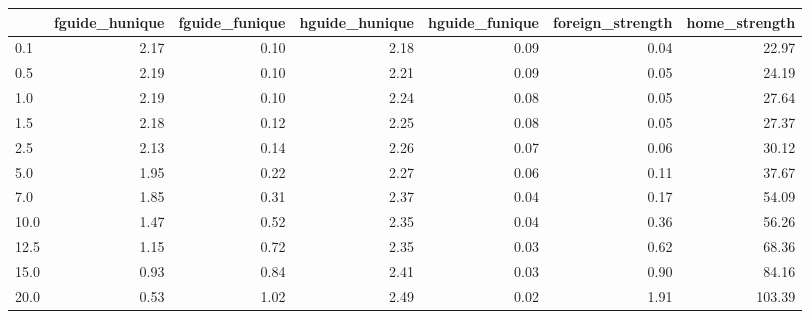 \begin{tabular}{lrrrrrr}
\toprule
 & fguide_hunique & fguide_funique & hguide_hunique & hguide_funique & foreign_strength & home_strength \\
\midrule
0.1 & 2.17 & 0.10 & 2.18 & 0.09 & 0.04 & 22.97 \\
0.5 & 2.19 & 0.10 & 2.21 & 0.09 & 0.05 & 24.19 \\
1.0 & 2.19 & 0.10 & 2.24 & 0.08 & 0.05 & 27.64 \\
1.5 & 2.18 & 0.12 & 2.25 & 0.08 & 0.05 & 27.37 \\
2.5 & 2.13 & 0.14 & 2.26 & 0.07 & 0.06 & 30.12 \\
5.0 & 1.95 & 0.22 & 2.27 & 0.06 & 0.11 & 37.67 \\
7.0 & 1.85 & 0.31 & 2.37 & 0.04 & 0.17 & 54.09 \\
10.0 & 1.47 & 0.52 & 2.35 & 0.04 & 0.36 & 56.26 \\
12.5 & 1.15 & 0.72 & 2.35 & 0.03 & 0.62 & 68.36 \\
15.0 & 0.93 & 0.84 & 2.41 & 0.03 & 0.90 & 84.16 \\
20.0 & 0.53 & 1.02 & 2.49 & 0.02 & 1.91 & 103.39 \\
\bottomrule
\end{tabular}
